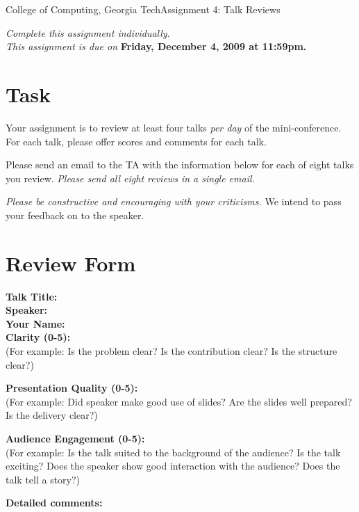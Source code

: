 \documentclass[11pt]{article}
\begin{document}


{College of Computing, Georgia Tech}{Assignment 4: Talk Reviews}

{\em Complete this assignment individually. \\  This
  assignment is due on} {\bf Friday, December 4, 2009 at 11:59pm.}

\section{Task}

Your assignment is to review at least four talks {\em per day} of the
mini-conference.  For each talk, please offer scores and comments for
each talk.

Please send an email to the TA with the information below for each of
eight talks you review.  {\em Please send all eight reviews in a single
  email.}

{\em Please be constructive and encouraging with your criticisms.}  We
intend to pass your feedback on to the speaker.

\section{Review Form}

{\bf Talk Title:} \\
{\bf Speaker:} \\
{\bf Your Name:} \\


{\bf Clarity (0-5): } \\
(For example: Is the problem clear?  Is the contribution clear?
Is the structure clear?)

{\bf Presentation Quality (0-5):} \\ (For example: Did speaker make good
use of slides?  Are the slides well prepared?  Is the delivery clear?)


{\bf Audience Engagement (0-5):} \\ (For example: Is the talk suited to the
background of the audience?  Is the talk exciting?  Does the speaker
show good interaction with the audience?  Does the talk tell a story?)


{\bf Detailed comments:} \\
\end{document}
